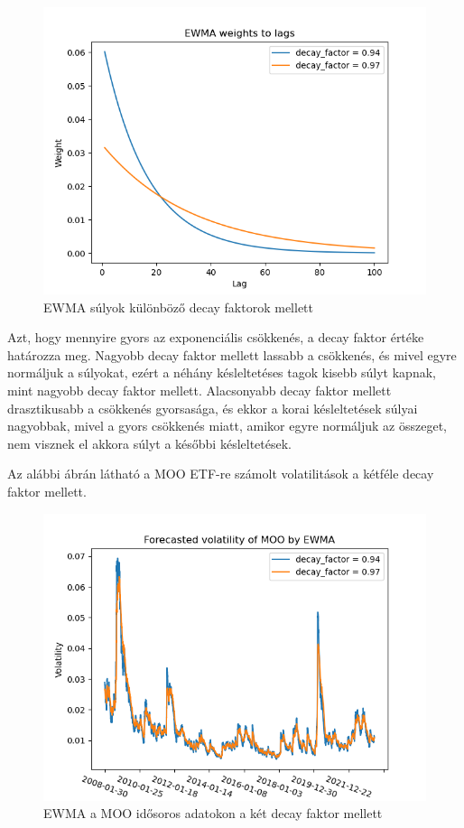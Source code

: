 \documentclass[12pt]{article}
\begin{document}
\begin{figure}[H]
	\centering
	\includegraphics[scale=0.9]{ewma_weights}
	\caption{EWMA súlyok különböző decay faktorok mellett}
\end{figure}

Azt, hogy mennyire gyors az exponenciális csökkenés, a decay faktor értéke határozza meg. Nagyobb decay faktor mellett lassabb a csökkenés, és mivel egyre normáljuk a súlyokat, ezért a néhány késleltetéses tagok kisebb súlyt kapnak, mint nagyobb decay faktor mellett. Alacsonyabb decay faktor mellett drasztikusabb a csökkenés gyorsasága, és ekkor a korai késleltetések súlyai nagyobbak, mivel a gyors csökkenés miatt, amikor egyre normáljuk az összeget, nem visznek el akkora súlyt a későbbi késleltetések. 

Az alábbi ábrán látható a MOO ETF-re számolt volatilitások a kétféle decay faktor mellett.

\begin{figure}[H]
	\centering
	\includegraphics[scale=0.9]{ewma_moo}
	\caption{EWMA a MOO idősoros adatokon a két decay faktor mellett}
\end{figure}
\end{document}
